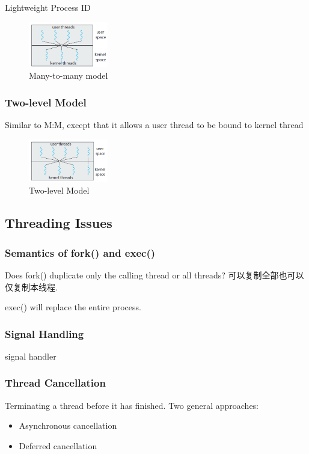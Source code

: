 Lightweight Process ID 

\begin{figure}[!htb]
    \centering
    \includegraphics[width=0.309\textwidth]{pic/OS4/Many-to-many model}
    \caption{Many-to-many model}
\end{figure}


\subsubsection{Two-level Model}
Similar to M:M, except that it allows a user thread to be bound to kernel thread

\begin{figure}[!htb]
    \centering
    \includegraphics[width=0.309\textwidth]{pic/OS4/Two-level Model}
    \caption{Two-level Model}
\end{figure}


\subsection{Threading Issues}
\subsubsection{Semantics of fork() and exec()}
Does fork() duplicate only the calling thread or all threads? 可以复制全部也可以仅复制本线程. 

exec() will replace the entire process.

\subsubsection{Signal Handling}
signal handler

\subsubsection{Thread Cancellation}
Terminating a thread before it has finished. Two general approaches:
\begin{itemize}
    \item Asynchronous cancellation
    \item Deferred cancellation
\end{itemize}

